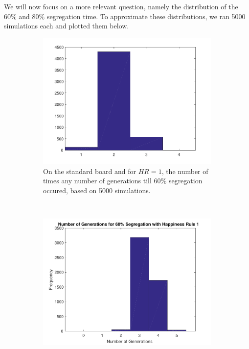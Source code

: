 We will now focus on a more relevant question, namely the distribution of the $60\%$ and $80\%$ segregation time. To approximate these distributions, we ran 5000 simulations each and plotted them below.
\begin{figure}[H]
\begin{subfigure}{0.45\textwidth}
    \centering
    \includegraphics[width=\textwidth]{./60_80_segregation_aantgen/60_segregation.pdf}
    \caption{On the standard board and for $HR=1$, the number of times any number of generations till $60\%$ segregation occured, based on 5000 simulations.}
    \label{fig:segaantgen_s60}
\end{subfigure}
~
\begin{subfigure}{0.45\textwidth}
    \centering
    \includegraphics[width=\textwidth]{./60_80_segregation_aantgen/4TypeBoard/60_segregation.pdf}

\end{subfigure}
\end{figure}
